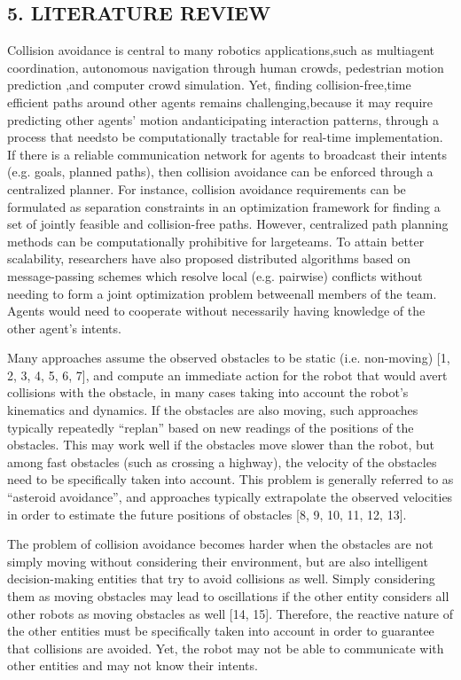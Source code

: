 \documentclass[12pt]{report}
\begin{document}
\begin{center}
\chapter*{5.  LITERATURE REVIEW}
\end{center}

Collision avoidance is central to many robotics applications,such as multiagent coordination, autonomous navigation through human crowds, pedestrian motion prediction ,and computer crowd simulation. Yet, finding collision-free,time efficient paths around other agents remains challenging,because it may require predicting other agents’ motion andanticipating interaction patterns, through a process that needsto be computationally tractable for real-time implementation. If  there  is  a  reliable  communication network for agents to broadcast their intents (e.g.  goals,  planned  paths),  then collision avoidance can be enforced through a centralized planner. For instance, collision avoidance requirements can be formulated as separation constraints  in an optimization framework for finding a set of jointly feasible and collision-free paths. However, centralized path planning methods can be computationally prohibitive for largeteams. To attain better scalability, researchers have also proposed  distributed  algorithms  based  on  message-passing schemes which resolve local (e.g. pairwise) conflicts without needing to form a joint optimization problem betweenall members of the team. Agents would need to cooperate without necessarily having knowledge of the other agent’s intents.

 Many approaches assume the observed obstacles to be static (i.e. non-moving) [1, 2, 3, 4, 5, 6, 7], and compute an immediate action for the robot that would avert collisions with the obstacle, in many cases taking into account the robot’s kinematics and dynamics. If the obstacles are also moving, such approaches typically repeatedly “replan” based on new readings of the positions of the obstacles. This may work well if the obstacles move slower than the robot, but among fast obstacles (such as crossing a highway), the velocity of the obstacles need to be specifically taken into account. This problem is generally referred to as “asteroid avoidance”, and approaches typically extrapolate the observed velocities in order to estimate the future positions of obstacles [8, 9, 10, 11, 12, 13].
 
The problem of collision avoidance becomes harder when the obstacles are
not simply moving without considering their environment, but are also intelligent
decision-making entities that try to avoid collisions as well. Simply considering
them as moving obstacles may lead to oscillations if the other entity considers all
other robots as moving obstacles as well [14, 15]. Therefore, the reactive nature of
the other entities must be specifically taken into account in order to guarantee that
collisions are avoided. Yet, the robot may not be able to communicate with other
entities and may not know their intents. 
\end{document}
